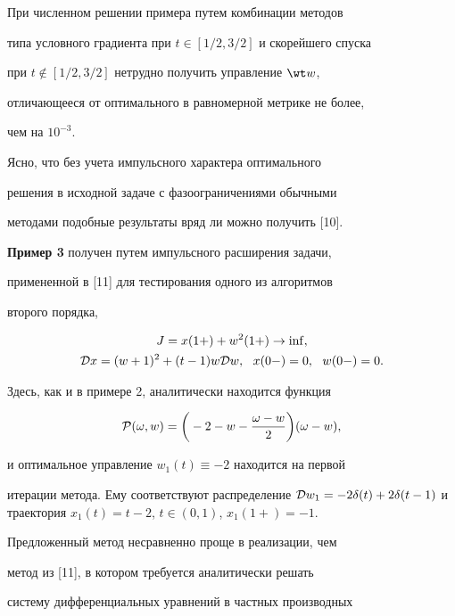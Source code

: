 При численном решении примера путем комбинации методов


типа условного градиента при $t\in [1/2,3/2]$ и скорейшего спуска


при $t \notin [1/2,3/2]$ нетрудно получить управление $\wt w$,


отличающееся от оптимального в равномерной метрике не более,


чем на $10^{-3}$.





Ясно, что без учета импульсного характера оптимального


решения в исходной задаче с фазоограничениями обычными


методами подобные результаты вряд ли можно получить [10].


\medskip





{\bf Пример 3} получен путем импульсного расширения задачи,


примененной в [11] для тестирования одного из алгоритмов


второго порядка,


\begin{gather*}


J = x(1+) + w^2(1+) \to \inf,\\


{\cal D} x = (w+1)^2 + (t-1)w{\cal D}w, \ \ x(0-)=0, \ \ w(0-)=0.


\end{gather*}


Здесь, как и в примере 2, аналитически находится функция


$$


{\cal P} (\omega, w) = \bigg(-2-w-\frac{\omega -w}{2}\bigg)(\omega - w),


$$


и оптимальное управление $w_1(t) \equiv -2$ находится на первой


итерации метода. Ему соответствуют распределение ${\cal D} w_1 = -2\delta(t)


+2\delta(t-1)$ и траектория $x_1(t)=t-2$, $t\in(0,1)$, $x_1(1+)=-1$.





Предложенный метод несравненно проще в реализации, чем


метод из [11], в котором требуется аналитически решать


систему дифференциальных уравнений в частных производных


